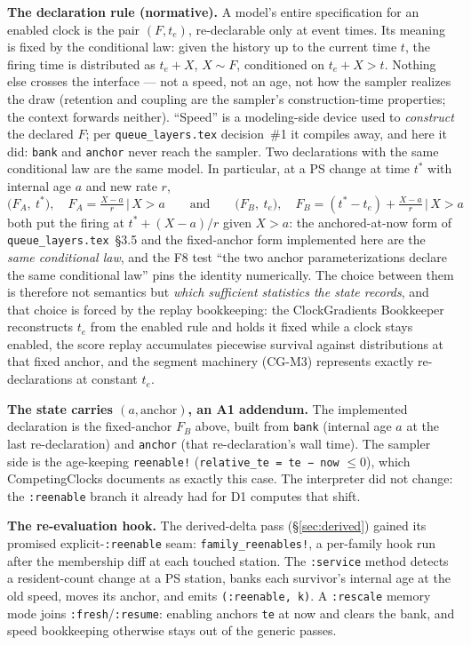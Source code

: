 \documentclass[11pt]{article}
\newcommand{\code}[1]{\texttt{#1}}
\begin{document}
\textbf{The declaration rule (normative).} A model's entire specification
for an enabled clock is the pair $(F, t_e)$, re-declarable only at event
times. Its meaning is fixed by the conditional law: given the history up to
the current time $t$, the firing time is distributed as $t_e + X$,
$X \sim F$, conditioned on $t_e + X > t$. Nothing else crosses the
interface --- not a speed, not an age, not how the sampler realizes the
draw (retention and coupling are the sampler's construction-time
properties; the context forwards neither). ``Speed'' is a modeling-side
device used to \emph{construct} the declared $F$; per
\code{queue\_layers.tex} decision~\#1 it compiles away, and here it did:
\code{bank} and \code{anchor} never reach the sampler. Two declarations
with the same conditional law are the same model. In particular, at a
PS change at time $t^\ast$ with internal age $a$ and new rate $r$,
\[
\big(F_A,\ t^\ast\big),\quad F_A = \tfrac{X-a}{r}\,\big|\,X>a
\qquad\text{and}\qquad
\big(F_B,\ t_e\big),\quad F_B = (t^\ast - t_e) + \tfrac{X-a}{r}\,\big|\,X>a
\]
both put the firing at $t^\ast + (X-a)/r$ given $X > a$: the
anchored-at-now form of \code{queue\_layers.tex}~\S3.5 and the fixed-anchor
form implemented here are the \emph{same conditional law}, and the F8 test
``the two anchor parameterizations declare the same conditional law'' pins
the identity numerically. The choice between them is therefore not
semantics but \emph{which sufficient statistics the state records}, and
that choice is forced by the replay bookkeeping: the ClockGradients
Bookkeeper reconstructs $t_e$ from the enabled rule and holds it fixed
while a clock stays enabled, the score replay accumulates piecewise
survival against distributions at that fixed anchor, and the segment
machinery (CG-M3) represents exactly re-declarations at constant $t_e$.

\textbf{The state carries $(a, \text{anchor})$, an A1 addendum.} The
implemented declaration is the fixed-anchor $F_B$ above, built from
\code{bank} (internal age $a$ at the last re-declaration) and \code{anchor}
(that re-declaration's wall time). The sampler side is the age-keeping
\code{reenable!} (\code{relative\_te = te − now} $\le 0$), which
CompetingClocks documents as exactly this case. The interpreter did not
change: the \code{:reenable} branch it already had for D1 computes that
shift.

\textbf{The re-evaluation hook.} The derived-delta pass (\S\ref{sec:derived})
gained its promised explicit-\code{:reenable} seam:
\code{family\_reenables!}, a per-family hook run after the membership diff
at each touched station. The \code{:service} method detects a
resident-count change at a PS station, banks each survivor's internal age
at the old speed, moves its anchor, and emits \code{(:reenable, k)}. A
\code{:rescale} memory mode joins \code{:fresh}/\code{:resume}: enabling
anchors \code{te} at now and clears the bank, and speed bookkeeping
otherwise stays out of the generic passes.
\end{document}
